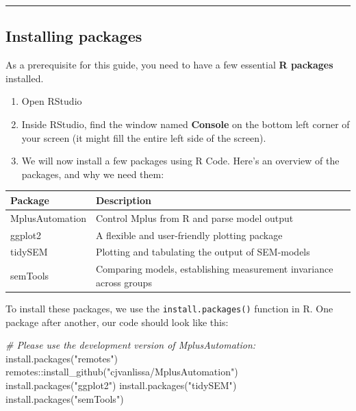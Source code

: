 \documentclass[
]{book}
\newenvironment{Shaded}{\begin{snugshade}}{\end{snugshade}}
\newcommand{\CommentTok}[1]{\textcolor[rgb]{0.56,0.35,0.01}{\textit{#1}}}
\newcommand{\FunctionTok}[1]{\textcolor[rgb]{0.00,0.00,0.00}{#1}}
\newcommand{\NormalTok}[1]{#1}
\newcommand{\SpecialCharTok}[1]{\textcolor[rgb]{0.00,0.00,0.00}{#1}}
\newcommand{\StringTok}[1]{\textcolor[rgb]{0.31,0.60,0.02}{#1}}
\providecommand{\tightlist}{%
  \setlength{\itemsep}{0pt}\setlength{\parskip}{0pt}}
\begin{document}
\begin{center}\rule{0.5\linewidth}{0.5pt}\end{center}

\hypertarget{installpackages}{%
\subsection{Installing packages}\label{installpackages}}

As a prerequisite for this guide, you need to have a few essential \textbf{R packages} installed.

\begin{enumerate}
\def\labelenumi{\arabic{enumi}.}
\tightlist
\item
  Open RStudio
\item
  Inside RStudio, find the window named \textbf{Console} on the bottom left corner of your screen (it might fill the entire left side of the screen).
\item
  We will now install a few packages using R Code. Here's an overview of the packages, and why we need them:
\end{enumerate}

\begin{tabular}{l|l}
\hline
Package & Description\\
\hline
MplusAutomation & Control Mplus from R and parse model output\\
\hline
ggplot2 & A flexible and user-friendly plotting package\\
\hline
tidySEM & Plotting and tabulating the output of SEM-models\\
\hline
semTools & Comparing models, establishing measurement invariance across groups\\
\hline
\end{tabular}

To install these packages, we use the \texttt{install.packages()} function in R. One package after another, our code should look like this:

\begin{Shaded}
\begin{Highlighting}[]
\CommentTok{\# Please use the development version of MplusAutomation:}
\FunctionTok{install.packages}\NormalTok{(}\StringTok{"remotes"}\NormalTok{)}
\NormalTok{remotes}\SpecialCharTok{::}\FunctionTok{install\_github}\NormalTok{(}\StringTok{"cjvanlissa/MplusAutomation"}\NormalTok{)}
\FunctionTok{install.packages}\NormalTok{(}\StringTok{"ggplot2"}\NormalTok{)}
\FunctionTok{install.packages}\NormalTok{(}\StringTok{"tidySEM"}\NormalTok{)}
\FunctionTok{install.packages}\NormalTok{(}\StringTok{"semTools"}\NormalTok{)}
\end{Highlighting}
\end{Shaded}
\end{document}
